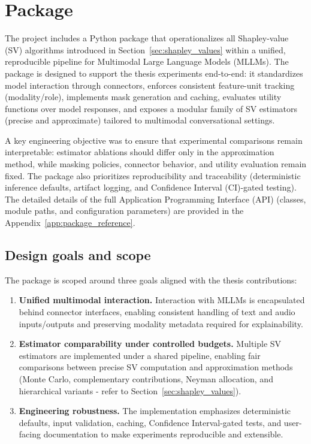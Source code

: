 \section{Package}
\label{sec:package}

The project includes a Python package that operationalizes all Shapley-value (SV) algorithms introduced in Section~\ref{sec:shapley_values} within a unified, reproducible pipeline for Multimodal Large Language Models (MLLMs). The package is designed to support the thesis experiments end-to-end: it standardizes model interaction through connectors, enforces consistent feature-unit tracking (modality/role), implements mask generation and caching, evaluates utility functions over model responses, and exposes a modular family of SV estimators (precise and approximate) tailored to multimodal conversational settings.

A key engineering objective was to ensure that experimental comparisons remain interpretable: estimator ablations should differ only in the approximation method, while masking policies, connector behavior, and utility evaluation remain fixed. The package also prioritizes reproducibility and traceability (deterministic inference defaults, artifact logging, and Confidence Interval (CI)-gated testing). The detailed details of the full Application Programming Interface (API) (classes, module paths, and configuration parameters) are provided in the Appendix~\ref{app:package_reference}.

\subsection{Design goals and scope}
\label{sec:package__goals}

The package is scoped around three goals aligned with the thesis contributions:

\begin{enumerate}
    \item \textbf{Unified multimodal interaction.} Interaction with MLLMs is encapsulated behind connector interfaces, enabling consistent handling of text and audio inputs/outputs and preserving modality metadata required for explainability.
    \item \textbf{Estimator comparability under controlled budgets.} Multiple SV estimators are implemented under a shared pipeline, enabling fair comparisons between precise SV computation and approximation methods (Monte Carlo, complementary contributions, Neyman allocation, and hierarchical variants - refer to Section~\ref{sec:shapley_values}).
    \item \textbf{Engineering robustness.} The implementation emphasizes deterministic defaults, input validation, caching, Confidence Interval-gated tests, and user-facing documentation to make experiments reproducible and extensible.
\end{enumerate}

